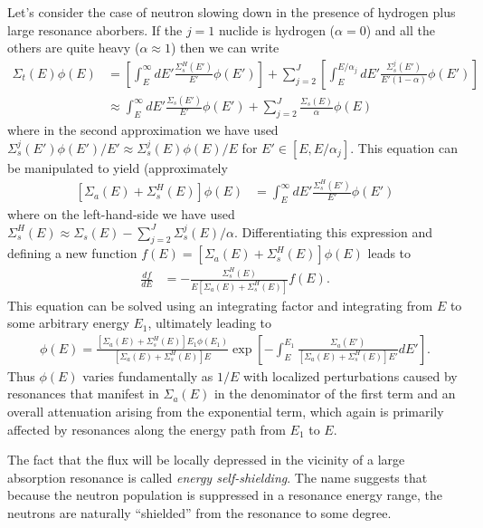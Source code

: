 \documentclass[11pt]{article}
\begin{document}
Let's consider the case of neutron slowing down in the presence of hydrogen plus large resonance aborbers.  If the \(j=1\) nuclide is hydrogen (\(\alpha=0\)) and all the others are quite heavy (\(\alpha \approx 1\)) then we can write
\begin{align}
  \Sigma_t(E) \phi(E)
  &=  \left[ \int_E^\infty dE' \frac{\Sigma_s^H(E')}{E'} \phi(E') \right]
    + \sum_{j=2}^J \left[ \int_E^{E/\alpha_j} dE' \frac{\Sigma_s^j(E')}{E'(1-\alpha)} \phi(E') \right] \\
  &\approx  \int_E^\infty dE' \frac{\Sigma_s(E')}{E'} \phi(E')
    + \sum_{j=2}^J \frac{\Sigma_s(E)}{\alpha} \phi(E) 
\end{align}
where in the second approximation we have used \(\Sigma_s^j(E')\phi(E')/E' \approx \Sigma_s^j(E)\phi(E)/E\) for \(E' \in [E, E/\alpha_j]\).  This equation can be manipulated to yield (approximately
\begin{align}
  \left[ \Sigma_a(E) + \Sigma_s^H(E) \right] \phi(E)
  &= \int_E^\infty dE' \frac{\Sigma_s^H(E')}{E'} \phi(E')
\end{align}
where on the left-hand-side we have used \(\Sigma_s^H(E) \approx \Sigma_s(E) - \sum_{j=2}^J \Sigma_s^j(E)/\alpha\).  Differentiating this expression and defining a new function \(f(E) = \left[ \Sigma_a(E) + \Sigma_s^H(E) \right] \phi(E)\) leads to
\begin{align}
  \frac{df}{dE} &= - \frac{\Sigma_s^H(E)}{E\left[ \Sigma_a(E) + \Sigma_s^H(E) \right]} f(E).
\end{align}
This equation can be solved using an integrating factor and integrating from \(E\) to some arbitrary energy \(E_1\), ultimately leading to
\begin{align}
  \phi(E) = \frac{\left[ \Sigma_a(E) + \Sigma_s^H(E) \right] E_1 \phi(E_1)}{\left[ \Sigma_a(E) + \Sigma_s^H(E) \right] E}
            \exp\left[ -\int_E^{E_1} \frac{\Sigma_a(E')}{\left[ \Sigma_a(E) + \Sigma_s^H(E) \right] E'} dE' \right].
\end{align}
Thus \(\phi(E)\) varies fundamentally as \(1/E\) with localized perturbations caused by resonances that manifest in \(\Sigma_a(E)\) in the denominator of the first term and an overall attenuation arising from the exponential term, which again is primarily affected by resonances along the energy path from \(E_1\) to \(E\).

The fact that the flux will be locally depressed in the vicinity of a large absorption resonance is called \emph{energy self-shielding}.  The name suggests that because the neutron population is suppressed in a resonance energy range, the neutrons are naturally ``shielded'' from the resonance to some degree.
\end{document}
